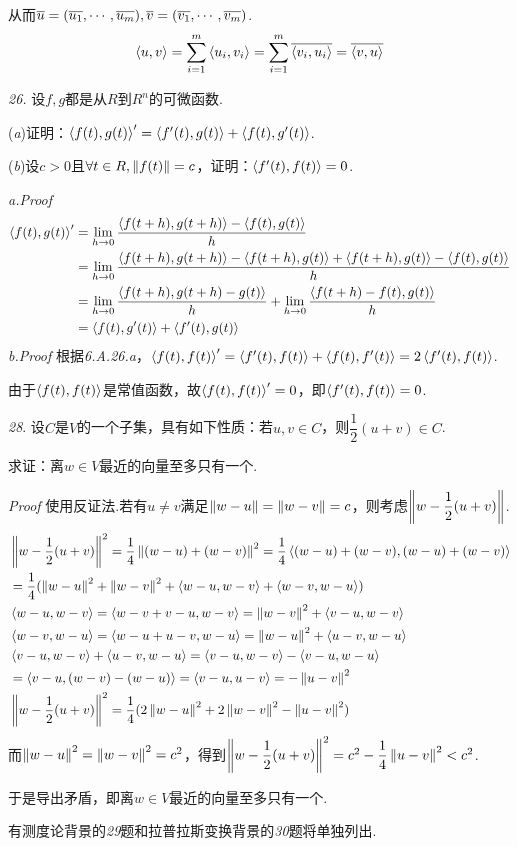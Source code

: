 从而\(\ol{u}=(\ol{u_1},\cdots,\ol{u_m}),\ol{v}=(\ol{v_1},\cdots,\ol{v_m})\).
    \begin{align*}
        \ip{u}{v}=\sum_{i=1}^m \ip{u_i}{v_i}=\sum_{i=1}^m \ol{\ip{v_i}{u_i}}=\ol{\ip{v}{u}}
    \end{align*}

\newpage

\textit{26.}
设\(f,g\)都是从\(R\)到\(R^n\)的可微函数.

(\textit{a})证明：\(\ip{f(t)}{g(t)}'=\ip{f'(t)}{g(t)}+\ip{f(t)}{g'(t)}\).

(\textit{b})设\(c>0\)且\(\forall t \in R,\norm{f(t)}=c\)，证明：\(\ip{f'(t)}{f(t)}=0\).

\textit{a.Proof}
    \begin{align*}
        \ip{f(t)}{g(t)}'&=\lim_{h \rightarrow 0}\dfrac{\ip{f(t+h)}{g(t+h)}-\ip{f(t)}{g(t)}}{h} \\
        &=\lim_{h \rightarrow 0}\dfrac{\ip{f(t+h)}{g(t+h)}-\ip{f(t+h)}{g(t)}+\ip{f(t+h)}{g(t)}-\ip{f(t)}{g(t)}}{h} \\
        &=\lim_{h \rightarrow 0}\dfrac{\ip{f(t+h)}{g(t+h)-g(t)}}{h}+\lim_{h \rightarrow 0}\dfrac{\ip{f(t+h)-f(t)}{g(t)}}{h} \\
        &=\ip{f(t)}{g'(t)}+\ip{f'(t)}{g(t)}
    \end{align*}
\textit{b.Proof}
根据\textit{6.A.26.a}，\(\ip{f(t)}{f(t)}'=\ip{f'(t)}{f(t)}+\ip{f(t)}{f'(t)}=2\ip{f'(t)}{f(t)}\).

由于\(\ip{f(t)}{f(t)}\)是常值函数，故\(\ip{f(t)}{f(t)}'=0\)，即\(\ip{f'(t)}{f(t)}=0\).

\hspace*{\fill}

\textit{28}.
设\(C\)是\(V\)的一个子集，具有如下性质：若\(u,v \in C\)，则\(\dfrac{1}{2}(u+v) \in C\).

求证：离\(w \in V\)最近的向量至多只有一个.

\textit{Proof}
使用反证法.若有\(u \ne v\)满足\(\norm{w-u}=\norm{w-v}=c\)，则考虑\(\norm{w-\dfrac{1}{2}(u+v)}\).
    \begin{align*}
        &\norm{w-\dfrac{1}{2}(u+v)}^2=\dfrac{1}{4}\norm{(w-u)+(w-v)}^2=\dfrac{1}{4}\ip{(w-u)+(w-v)}{(w-u)+(w-v)} \\
        &=\dfrac{1}{4}(\norm{w-u}^2+\norm{w-v}^2+\ip{w-u}{w-v}+\ip{w-v}{w-u}) \\
        &\ip{w-u}{w-v}=\ip{w-v+v-u}{w-v}=\norm{w-v}^2+\ip{v-u}{w-v} \\
        &\ip{w-v}{w-u}=\ip{w-u+u-v}{w-u}=\norm{w-u}^2+\ip{u-v}{w-u} \\
        &\ip{v-u}{w-v}+\ip{u-v}{w-u}=\ip{v-u}{w-v}-\ip{v-u}{w-u} \\
        &=\ip{v-u}{(w-v)-(w-u)}=\ip{v-u}{u-v}=-\norm{u-v}^2 \\
        &\norm{w-\dfrac{1}{2}(u+v)}^2=\dfrac{1}{4}(2\norm{w-u}^2+2\norm{w-v}^2-\norm{u-v}^2)
    \end{align*}
而\(\norm{w-u}^2=\norm{w-v}^2=c^2\)，得到\(\norm{w-\dfrac{1}{2}(u+v)}^2=c^2-\dfrac{1}{4}\norm{u-v}^2<c^2\).

于是导出矛盾，即离\(w \in V\)最近的向量至多只有一个.

\hspace*{\fill}

有测度论背景的\textit{29}题和拉普拉斯变换背景的\textit{30}题将单独列出.

